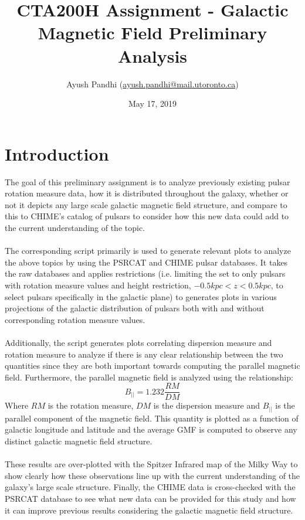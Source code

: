 \documentclass[12pt]{article}
\begin{document}
\title{CTA200H Assignment - Galactic Magnetic Field Preliminary Analysis}
\author{Ayush Pandhi (\href{mailto:ayush.pandhi@mail.utoronto.ca}{ayush.pandhi@mail.utoronto.ca})}
\date{May 17, 2019}
\maketitle

\section{Introduction}
    The goal of this preliminary assignment is to analyze previously existing pulsar rotation measure data, how it is distributed throughout the galaxy, whether or not it depicts any large scale galactic magnetic field structure, and compare to this to CHIME's catalog of pulsars to consider how this new data could add to the current understanding of the topic. 
    \\
    \\
    The corresponding script primarily is used to generate relevant plots to analyze the above topics by using the PSRCAT and CHIME pulsar databases. It takes the raw databases and applies restrictions (i.e. limiting the set to only pulsars with rotation measure values and height restriction, $-0.5 kpc < z < 0.5 kpc$, to select pulsars specifically in the galactic plane) to generates plots in various projections of the galactic distribution of pulsars both with and without corresponding rotation measure values.
    \\
    \\
    Additionally, the script generates plots correlating dispersion measure and rotation measure to analyze if there is any clear relationship between the two quantities since they are both important towards computing the parallel magnetic field. Furthermore, the parallel magnetic field is analyzed using the relationship:
    \begin{equation}
        B_{||} = 1.232 \frac{RM}{DM} \label{eq:1}
    \end{equation}
    Where $RM$ is the rotation measure, $DM$ is the dispersion measure and $B_{||}$ is the parallel component of the magnetic field. This quantity is plotted as a function of galactic longitude and latitude and the average GMF is computed to observe any distinct galactic magnetic field structure.
    \\
    \\
    These results are over-plotted with the Spitzer Infrared map of the Milky Way to show clearly how these observations line up with the current understanding of the galaxy's large scale structure. Finally, the CHIME data is cross-checked with the PSRCAT database to see what new data can be provided for this study and how it can improve previous results considering the galactic magnetic field structure.
\end{document}
